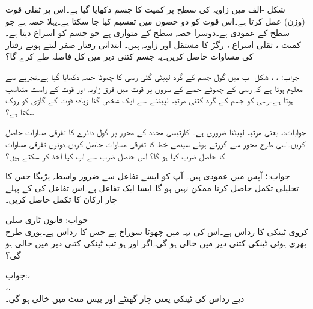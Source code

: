 شکل -الف میں  زاویہ کی سطح پر  کمیت کا جسم دکھایا گیا ہے۔اس پر ثقلی قوت (وزن)  عمل کرتا ہے۔اس قوت کو دو حصوں میں تقسیم کیا جا سکتا ہے۔پہلا حصہ  ہے جو سطح کے عمودی ہے۔دوسرا حصہ سطح کے متوازی ہے جو جسم کو اسراع دیتا ہے۔  کمیت ، ثقلی اسراع ، رگڑ کا مستقل  اور زاویہ  ہیں۔ ابتدائی رفتار صفر لیتے ہوئے رفتار  کی مساوات حاصل کریں۔یہ جسم کتنی دیر میں کل  فاصلہ طے کرے گا؟

جواب: ، ، 
شکل -ب میں گول جسم کے گرد لپیٹی گئی رسی کا چھوٹا حصہ دکھایا گیا ہے۔تجربے سے معلوم ہوتا ہے کہ رسی کے چھوٹے حصے کے سروں پر قوت میں فرق زاویہ  اور قوت  کے راست متناسب ہوتا ہے۔رسی کو جسم کے گرد کتنی مرتبہ لپیٹنے سے ایک شخص  گنا زیادہ قوت کے گاڑی کو روک سکتا ہے؟

جوابات:،  یعنی  مرتبہ لپیٹنا ضروری ہے۔
کارتیسی محدد کے محور پر گول دائرے  کا تفرقی مساوات  حاصل کریں۔اسی طرح محور سے گزرتے ہوئے سیدھے خط کا تفرقی مساوات  حاصل کریں۔دونوں تفرقی مساوات کا حاصل ضرب کیا ہو گا؟ اس حاصل ضرب سے آپ کیا اخذ کر سکتے ہیں؟

جواب:؛ آپس میں عمودی ہیں۔
آپ کو ایسے تفاعل سے ضرور واسطہ پڑیگا جس کا تحلیلی تکمل حاصل کرنا ممکن نہیں ہو گا۔ایسا ایک تفاعل  ہے۔اس تفاعل کی  کے پہلے چار ارکان کا تکمل حاصل کریں۔

جواب:
\quad قانون ٹاری سلی\\
کروی ٹینکی کا رداس  ہے۔اس کی تہہ میں چھوٹا سوراخ ہے جس کا رداس  ہے۔پوری طرح بھری ہوئی ٹینکی کتنی دیر میں خالی ہو گی۔اگر  اور  ہو تب ٹینکی کتنی دیر میں خالی ہو گی؟

جواب:،\\
 ،\quad  {}،\\
 دیے رداس کی ٹینکی  یعنی چار گھنٹے اور بیس منٹ میں خالی ہو گی۔

